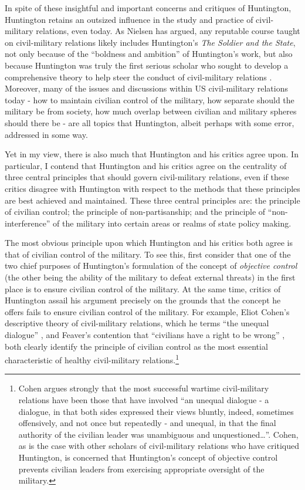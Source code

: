 \documentclass[
  12pt,
  oneside]{memoir}
\begin{document}
In spite of these insightful and important concerns and critiques of Huntington, Huntington retains an outsized influence in the study and practice of civil-military relations, even today. As Nielsen has argued, any reputable course taught on civil-military relations likely includes Huntington's \emph{The Soldier and the State}, not only because of the ``boldness and ambition'' of Huntington's work, but also because Huntington was truly the first serious scholar who sought to develop a comprehensive theory to help steer the conduct of civil-military relations \autocite[369]{nielsen_american_2012}. Moreover, many of the issues and discussions within US civil-military relations today - how to maintain civilian control of the military, how separate should the military be from society, how much overlap between civilian and military spheres should there be - are all topics that Huntington, albeit perhaps with some error, addressed in some way.

Yet in my view, there is also much that Huntington and his critics agree upon. In particular, I contend that Huntington and his critics agree on the centrality of three central principles that should govern civil-military relations, even if these critics disagree with Huntington with respect to the methods that these principles are best achieved and maintained. These three central principles are: the principle of civilian control; the principle of non-partisanship; and the principle of ``non-interference'' of the military into certain areas or realms of state policy making.

The most obvious principle upon which Huntington and his critics both agree is that of civilian control of the military. To see this, first consider that one of the two chief purposes of Huntington's formulation of the concept of \emph{objective control} (the other being the ability of the military to defeat external threats) in the first place is to ensure civilian control of the military. At the same time, critics of Huntington assail his argument precisely on the grounds that the concept he offers fails to ensure civilian control of the military. For example, Eliot Cohen's descriptive theory of civil-military relations, which he terms ``the unequal dialogue'' \autocite[208-224]{cohen_supreme_2003}, and Feaver's contention that ``civilians have a right to be wrong'' \autocites[117]{feaver_right_2011}{feaver_armed_2003}, both clearly identify the principle of civilian control as the most essential characteristic of healthy civil-military relations.\footnote{Cohen argues strongly that the most successful wartime civil-military relations have been those that have involved ``an unequal dialogue - a dialogue, in that both sides expressed their views bluntly, indeed, sometimes offensively, and not once but repeatedly - and unequal, in that the final authority of the civilian leader was unambiguous and unquestioned\ldots{}''\autocite[209]{cohen_supreme_2003}. Cohen, as is the case with other scholars of civil-military relations who have critiqued Huntington, is concerned that Huntington's concept of objective control prevents civilian leaders from exercising appropriate oversight of the military.}
\end{document}
